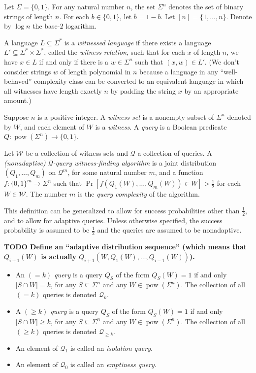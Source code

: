 \documentclass{article}
\newcommand{\todo}[1]{\textbf{TODO #1}}
\newcommand{\mc}{\mathcal}
\DeclareMathOperator{\pow}{pow}
\begin{document}
Let $\Sigma = \{0, 1\}$.
For any natural number $n$, the set $\Sigma^n$ denotes the set of binary strings of length $n$.
For each $b \in \{0, 1\}$, let $\bar{b} = 1 - b$.
Let $[n] = \{1, \dotsc, n\}$.
Denote by $\log n$ the base-$2$ logarithm.

A language $L \subseteq \Sigma^*$ is a \emph{witnessed language} if there exists a language $L' \subseteq \Sigma^* \times \Sigma^*$, called the \emph{witness relation}, such that for each $x$ of length $n$, we have $x \in L$ if and only if there is a $w \in \Sigma^n$ such that $(x, w) \in L'$.
(We don't consider strings $w$ of length polynomial in $n$ because a language in any ``well-behaved'' complexity class can be converted to an equivalent language in which all witnesses have length exactly $n$ by padding the string $x$ by an appropriate amount.)

Suppose $n$ is a positive integer.
A \emph{witness set} is a nonempty subset of $\Sigma^n$ denoted by $W$, and each element of $W$ is a \emph{witness}.
A \emph{query} is a Boolean predicate $Q \colon \pow(\Sigma^n) \to \{0, 1\}$.

\begin{definition}
  Let $\mc{W}$ be a collection of witness sets and $\mc{Q}$ a collection of queries.
  A \emph{(nonadaptive) $\mc{Q}$-query witness-finding algorithm} is a joint distribution $(Q_1, \dotsc, Q_m)$ on $\mc{Q}^m$, for some natural number $m$, and a function $f \colon \{0, 1\}^m \to \Sigma^n$ such that $\Pr[f(Q_1(W), \dotsc, Q_m(W)) \in W] > \frac{1}{2}$ for each $W \in \mc{W}$.
  The number $m$ is the \emph{query complexity} of the algorithm.
\end{definition}

This definition can be generalized to allow for success probabilities other than $\frac{1}{2}$, and to allow for adaptive queries.
Unless otherwise specified, the success probability is assumed to be $\frac{1}{2}$ and the queries are assumed to be nonadaptive.

\todo{Define an ``adaptive distribution sequence'' (which means that $Q_{i + 1}(W)$ is actually $Q_{i + 1}(W, Q_1(W), \dotsc, Q_{i - 1}(W))$).}

\begin{itemize}
\item
  An \emph{$(= k)$ query} is a query $Q_S$ of the form $Q_{S}(W) = 1$ if and only $|S \cap W| = k$, for any $S \subseteq \Sigma^n$ and any $W \in \pow(\Sigma^n)$.
  The collection of all $(= k)$ queries is denoted $\mc{Q}_k$.
\item
  A \emph{$(\geq k)$ query} is a query $Q_S$ of the form $Q_{S}(W) = 1$ if and only $|S \cap W| \geq k$, for any $S \subseteq \Sigma^n$ and any $W \in \pow(\Sigma^n)$.
  The collection of all $(\geq k)$ queries is denoted $\mc{Q}_{\geq k}$.
\item
  An element of $\mc{Q}_1$ is called an \emph{isolation query}.
\item
  An element of $\mc{Q}_0$ is called an \emph{emptiness query}.
\end{itemize}
\end{document}
